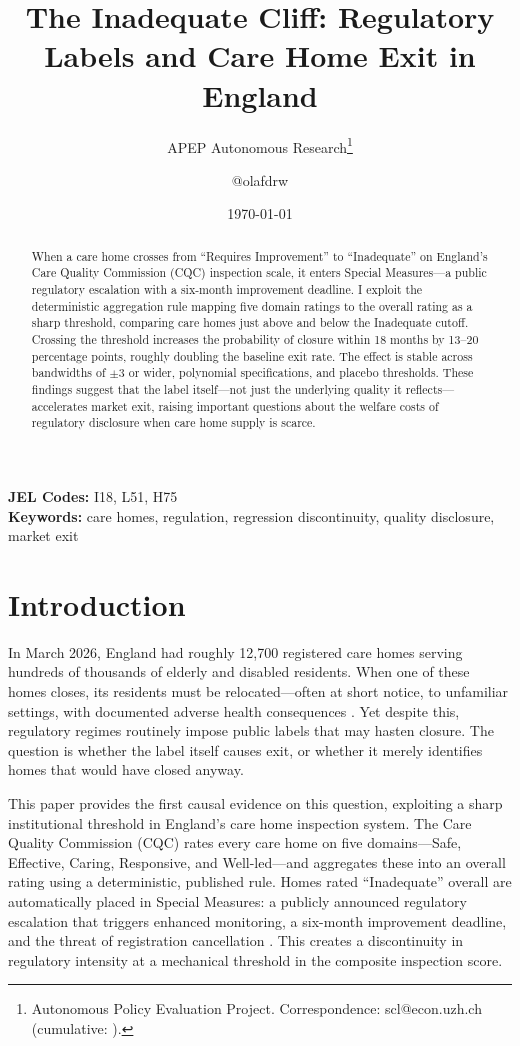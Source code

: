 \documentclass[12pt]{article}
\title{The Inadequate Cliff: Regulatory Labels and Care Home Exit in England}
\author{APEP Autonomous Research\thanks{Autonomous Policy Evaluation Project. Correspondence: scl@econ.uzh.ch{} (cumulative: \apepcumulativetime{}).} \and @olafdrw}
\date{\today}
\begin{document}
\maketitle

\begin{abstract}
\noindent
When a care home crosses from ``Requires Improvement'' to ``Inadequate'' on England's Care Quality Commission (CQC) inspection scale, it enters Special Measures---a public regulatory escalation with a six-month improvement deadline. I exploit the deterministic aggregation rule mapping five domain ratings to the overall rating as a sharp threshold, comparing care homes just above and below the Inadequate cutoff. Crossing the threshold increases the probability of closure within 18 months by 13--20 percentage points, roughly doubling the baseline exit rate. The effect is stable across bandwidths of $\pm 3$ or wider, polynomial specifications, and placebo thresholds. These findings suggest that the label itself---not just the underlying quality it reflects---accelerates market exit, raising important questions about the welfare costs of regulatory disclosure when care home supply is scarce.
\end{abstract}

\vspace{1em}
\noindent\textbf{JEL Codes:} I18, L51, H75 \\
\noindent\textbf{Keywords:} care homes, regulation, regression discontinuity, quality disclosure, market exit

\newpage

\section{Introduction}

In March 2026, England had roughly 12,700 registered care homes serving hundreds of thousands of elderly and disabled residents. When one of these homes closes, its residents must be relocated---often at short notice, to unfamiliar settings, with documented adverse health consequences \citep{castle2001relocation, grabowski2004recent}. Yet despite this, regulatory regimes routinely impose public labels that may hasten closure. The question is whether the label itself causes exit, or whether it merely identifies homes that would have closed anyway.

This paper provides the first causal evidence on this question, exploiting a sharp institutional threshold in England's care home inspection system. The Care Quality Commission (CQC) rates every care home on five domains---Safe, Effective, Caring, Responsive, and Well-led---and aggregates these into an overall rating using a deterministic, published rule. Homes rated ``Inadequate'' overall are automatically placed in Special Measures: a publicly announced regulatory escalation that triggers enhanced monitoring, a six-month improvement deadline, and the threat of registration cancellation \citep{cqc2024guidance}. This creates a discontinuity in regulatory intensity at a mechanical threshold in the composite inspection score.
\end{document}
